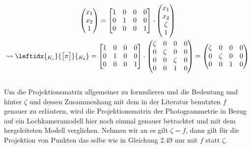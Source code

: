 		\begin{gather}
		\begin{pmatrix}
		x_1\\x_2\\1
		\end{pmatrix} 
		=
		\begin{bmatrix}
		1&0&0&0\\
		0&1&0&0\\
		0&0&0&1\\
		\end{bmatrix} \cdot
		\begin{pmatrix}
		x_1\\x_2\\\zeta\\1
		\end{pmatrix}\\
		\leadsto 	
		\leftidx{_{K_{c}}}{\begin{bmatrix}
			\pi
			\end{bmatrix}}{_{K_{b}}} 
		= 	\begin{bmatrix}
		1&0&0&0\\
		0&1&0&0\\
		0&0&0&1\\
		\end{bmatrix} \cdot
		\begin{pmatrix}
		\zeta&0&0&0\\
		0&\zeta&0&0\\
		0&0&\zeta&0\\
		0&0&1&0
		\end{pmatrix} 
		=
		\begin{pmatrix}
		\zeta&0&0&0\\
		0&\zeta&0&0\\
		0&0&1&0\\
		\end{pmatrix}
		\end{gather}\\
		
		Um die Projektionsmatrix allgemeiner zu formulieren und die Bedeutung und hinter $\zeta$ und dessen Zusammenhang mit dem in der Literatur benutzten $f$ genauer zu erläutern, wird die Projektionsmatrix der Photogrammetrie in Bezug auf ein Lochkameramodell\cite{HZ} hier noch einmal genauer betrachtet und mit dem hergeleiteten Modell verglichen. Nehmen wir an es gilt $\zeta = f$, dann gilt für die Projektion von Punkten das selbe wie in Gleichung 2.49 nur mit $f$ statt $\zeta$. 
		
